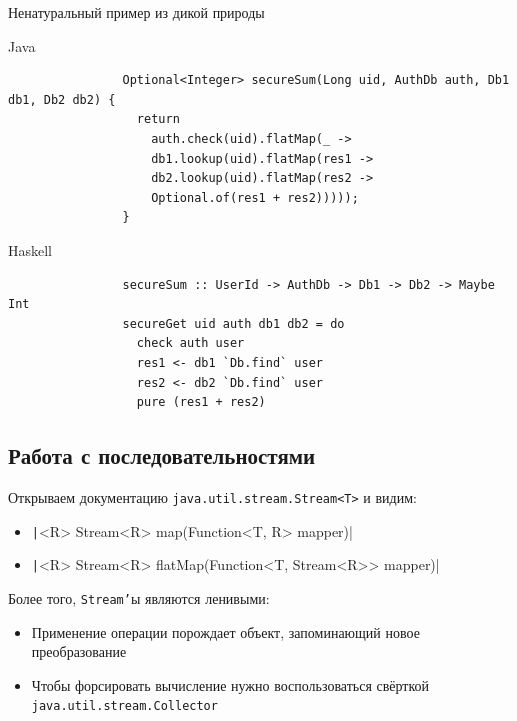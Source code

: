     \begin{frame}[fragile]{Ненатуральный пример из дикой природы}
        \vspace{-0.5em}
        \begin{block}{Java}
            \begin{verbatim}
                Optional<Integer> secureSum(Long uid, AuthDb auth, Db1 db1, Db2 db2) {
                  return
                    auth.check(uid).flatMap(_ ->
                    db1.lookup(uid).flatMap(res1 ->
                    db2.lookup(uid).flatMap(res2 ->
                    Optional.of(res1 + res2)))));
                }
            \end{verbatim}
        \end{block}
        \begin{block}{Haskell}
            \begin{verbatim}
                secureSum :: UserId -> AuthDb -> Db1 -> Db2 -> Maybe Int
                secureGet uid auth db1 db2 = do
                  check auth user
                  res1 <- db1 `Db.find` user
                  res2 <- db2 `Db.find` user
                  pure (res1 + res2)
            \end{verbatim}
        \end{block}
    \end{frame}

    \subsection{Работа с последовательностями}

    \begin{frame}[fragile]{\subsecname}
        \vspace{-0.5em}
        Открываем документацию \texttt{java.util.stream.Stream<T>} и видим:
        \begin{itemize}
            \item \texttt|<R> Stream<R> map(Function<T, R> mapper)|
            \item \texttt|<R> Stream<R> flatMap(Function<T, Stream<R>> mapper)|
        \end{itemize}
        \vspace{1em}
        Более того, \texttt{Stream'}ы являются ленивыми:
        \begin{itemize}
            \item Применение операции порождает объект, запоминающий новое преобразование
            \item Чтобы форсировать вычисление нужно воспользоваться свёрткой \texttt{java.util.stream.Collector}
        \end{itemize}
    \end{frame}

